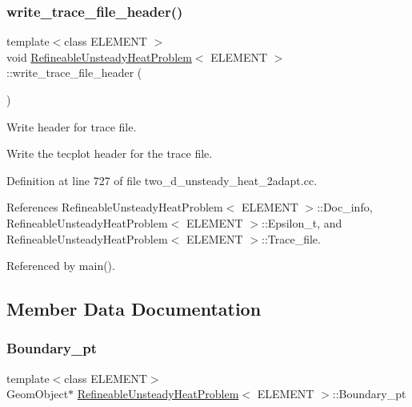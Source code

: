 \subsubsection{\texorpdfstring{write\+\_\+trace\+\_\+file\+\_\+header()}{write\_trace\_file\_header()}}
{\footnotesize\ttfamily template$<$class E\+L\+E\+M\+E\+NT $>$ \\
void \hyperlink{classRefineableUnsteadyHeatProblem}{Refineable\+Unsteady\+Heat\+Problem}$<$ E\+L\+E\+M\+E\+NT $>$\+::write\+\_\+trace\+\_\+file\+\_\+header (\begin{DoxyParamCaption}{ }\end{DoxyParamCaption})}



Write header for trace file. 

Write the tecplot header for the trace file. 

Definition at line 727 of file two\+\_\+d\+\_\+unsteady\+\_\+heat\+\_\+2adapt.\+cc.



References Refineable\+Unsteady\+Heat\+Problem$<$ E\+L\+E\+M\+E\+N\+T $>$\+::\+Doc\+\_\+info, Refineable\+Unsteady\+Heat\+Problem$<$ E\+L\+E\+M\+E\+N\+T $>$\+::\+Epsilon\+\_\+t, and Refineable\+Unsteady\+Heat\+Problem$<$ E\+L\+E\+M\+E\+N\+T $>$\+::\+Trace\+\_\+file.



Referenced by main().



\subsection{Member Data Documentation}
\mbox{\label{classRefineableUnsteadyHeatProblem_a368512778fbfd59e918104340466b1df}} 
\subsubsection{\texorpdfstring{Boundary\+\_\+pt}{Boundary\_pt}}
{\footnotesize\ttfamily template$<$class E\+L\+E\+M\+E\+NT$>$ \\
Geom\+Object$\ast$ \hyperlink{classRefineableUnsteadyHeatProblem}{Refineable\+Unsteady\+Heat\+Problem}$<$ E\+L\+E\+M\+E\+NT $>$\+::Boundary\+\_\+pt\hspace{0.3cm}{\ttfamily [private]}}



